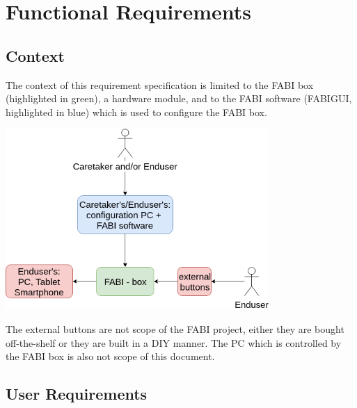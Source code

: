 \documentclass[]{scrreprt}%
\newcommand{\note}[1]{\textcolor{black!50}{\textit{Note: #1}}}
\begin{document}



% 
% 
% 


\chapter{Functional Requirements}

\section{Context}

The context of this requirement specification is limited to the FABI box (highlighted in green), a hardware module, and to the 
FABI software (FABIGUI, highlighted in blue) which is used to configure the FABI box.

\begin{center}
    \includegraphics[width=100mm]{context_diagram_FABI.png}
\end{center}


The external buttons are not scope of the FABI project, either they are bought off-the-shelf or they are built in a DIY manner. The PC which
is controlled by the FABI box is also not scope of this document.


\section{User Requirements}
\end{document}

